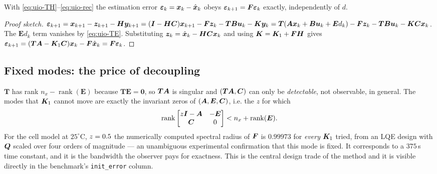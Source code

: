 \begin{theorem}\label{th:uio}
With \eqref{eq:uio-TH}--\eqref{eq:uio-rec} the estimation error
$\bm{\varepsilon}_k = \bm{x}_k - \hat{\bm{x}}_k$ obeys $\bm{\varepsilon}_{k+1} = \bm{F}\bm{\varepsilon}_k$ exactly, independently of $d$.
\end{theorem}
\begin{proof}[Proof sketch]
$\bm{\varepsilon}_{k+1} = \bm{x}_{k+1} - \bm{z}_{k+1} - \bm{H}\bm{y}_{k+1}
= (\bm{I}-\bm{H}\bm{C})\bm{x}_{k+1} - \bm{F}\bm{z}_k - \bm{T}\bm{B}\bm{u}_k - \bm{K}\bm{y}_k
= \bm{T}(\bm{A}\bm{x}_k + \bm{B}\bm{u}_k + \bm{E} d_k) - \bm{F}\bm{z}_k - \bm{T}\bm{B}\bm{u}_k - \bm{K}\bm{C}\bm{x}_k$.
The $\bm{E} d_k$ term vanishes by \eqref{eq:uio-TE}.  Substituting
$\bm{z}_k = \hat{\bm{x}}_k - \bm{H}\bm{C}\bm{x}_k$ and using $\bm{K} = \bm{K}_1+\bm{F}\bm{H}$ gives
$\bm{\varepsilon}_{k+1} = (\bm{T}\bm{A}-\bm{K}_1\bm{C})\bm{x}_k - \bm{F}\hat{\bm{x}}_k = \bm{F}\bm{\varepsilon}_k$.
\end{proof}

\subsection{Fixed modes: the price of decoupling}
\label{sec:uio-zeros}
$\bm{T}$ has rank $n_x - \operatorname{rank}(\bm{E})$ because $\bm{T}\bm{E}=\bm{0}$, so $\bm{T}\bm{A}$ is singular
and $(\bm{T}\bm{A},\bm{C})$ can only be \emph{detectable}, not observable, in general.  The modes that
$\bm{K}_1$ cannot move are exactly the invariant zeros of $(\bm{A},\bm{E},\bm{C})$, i.e. the $z$ for which
\begin{equation}
\operatorname{rank}\begin{bmatrix} z\bm{I}-\bm{A} & -\bm{E}\\ \bm{C} & 0\end{bmatrix} < n_x + \operatorname{rank}(\bm{E}) .
\label{eq:uio-zeros}
\end{equation}
For the cell model at $25^\circ$C, $z=0.5$ the numerically computed spectral radius of $\bm{F}$ is
$0.99973$ for \emph{every} $\bm{K}_1$ tried, from an LQE design with $\bm{Q}$ scaled over four orders of
magnitude --- an unambiguous experimental confirmation that this mode is fixed.  It corresponds to
a $375$\,s time constant, and it is the bandwidth the observer pays for exactness.  This is the
central design trade of the method and it is visible directly in the benchmark's
\texttt{init\_error} column.

